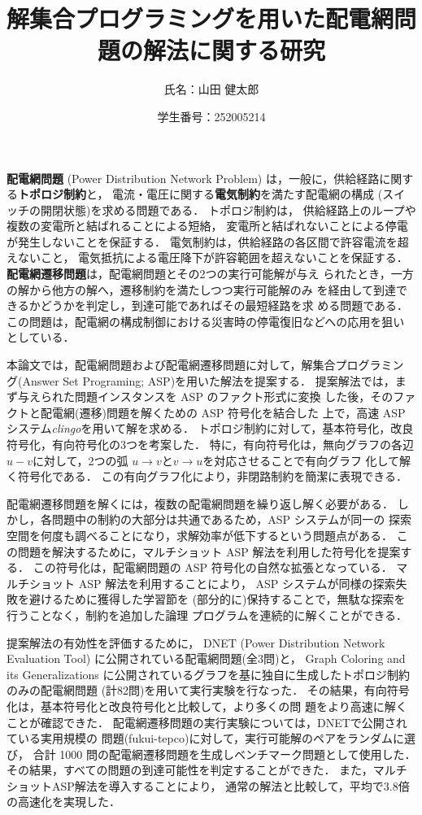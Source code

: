 \documentclass[dvipdfmx,a4paper]{jsarticle}
\title{解集合プログラミングを用いた配電網問題の解法に関する研究}
\author{氏名：山田 健太郎}
\date{学生番号：252005214}
\begin{document}
\maketitle

\textbf{配電網問題} (Power Distribution Network Problem)
は，一般に，供給経路に関する\textbf{トポロジ制約}と，
電流・電圧に関する\textbf{電気制約}を満たす配電網の構成
(スイッチの開閉状態)を求める問題である．
トポロジ制約は，
供給経路上のループや複数の変電所と結ばれることによる短絡，
変電所と結ばれないことによる停電
が発生しないことを保証する．
電気制約は，供給経路の各区間で許容電流を超えないこと，
電気抵抗による電圧降下が許容範囲を超えないことを保証する．
%
\textbf{配電網遷移問題}は，配電網問題とその2つの実行可能解が与え
られたとき，一方の解から他方の解へ，遷移制約を満たしつつ実行可能解のみ
を経由して到達できるかどうかを判定し，到達可能であればその最短経路を求
める問題である．
この問題は，配電網の構成制御における災害時の停電復旧などへの応用を狙い
としている．

本論文では，配電網問題および配電網遷移問題に対して，解集合プログラミン
グ(Answer Set Programing; ASP)を用いた解法を提案する．
提案解法では，まず与えられた問題インスタンスを ASP のファクト形式に変換
した後，そのファクトと配電網(遷移)問題を解くための ASP 符号化を結合した
上で，高速 ASP システム\textit{clingo}を用いて解を求める．
トポロジ制約に対して，基本符号化，改良符号化，有向符号化の3つを考案した．
特に，有向符号化は，無向グラフの各辺$u-v$に対して，2つの弧
$u\rightarrow v$と$v\rightarrow u$を対応させることで有向グラフ
化して解く符号化である．
この有向グラフ化により，非閉路制約を簡潔に表現できる．

配電網遷移問題を解くには，複数の配電網問題を繰り返し解く必要がある．
しかし，各問題中の制約の大部分は共通であるため，ASP システムが同一の
探索空間を何度も調べることになり，求解効率が低下するという問題点がある．
この問題を解決するために，マルチショット ASP 解法を利用した符号化を提案する．
この符号化は，配電網問題の ASP 符号化の自然な拡張となっている．
マルチショット ASP 解法を利用することにより，
ASP システムが同様の探索失敗を避けるために獲得した学習節を
(部分的に)保持することで，無駄な探索を行うことなく，制約を追加した論理
プログラムを連続的に解くことができる．

提案解法の有効性を評価するために，
DNET (Power Distribution Network Evaluation Tool)
に公開されている配電網問題(全3問)と，
Graph Coloring and its Generalizations
に公開されているグラフを基に独自に生成したトポロジ制約のみの配電網問題
(計82問)を用いて実行実験を行なった．
その結果，有向符号化は，基本符号化と改良符号化と比較して，より多くの問
題をより高速に解くことが確認できた．
%
配電網遷移問題の実行実験については，DNETで公開されている実用規模の
問題({\sf fukui-tepco})に対して，実行可能解のペアをランダムに選び，
合計 1000 問の配電網遷移問題を生成しベンチマーク問題として使用した．
その結果，すべての問題の到達可能性を判定することができた．
また，マルチショットASP解法を導入することにより，
通常の解法と比較して，平均で3.8倍の高速化を実現した．
\end{document}
